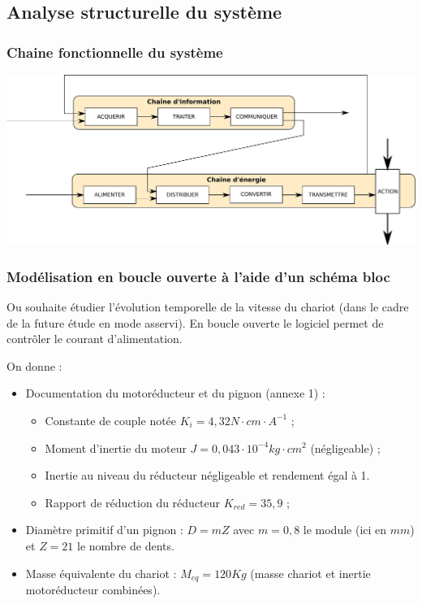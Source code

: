 \subsection{Analyse structurelle du système}
\subsubsection{Chaine fonctionnelle du système}


\begin{center}
\includegraphics[width=1.0\textwidth]{images/chaine_fonctionnelle_vierge.pdf}
\end{center}

\subsubsection{Modélisation en boucle ouverte à l'aide d'un schéma bloc}

Ou souhaite étudier l'évolution temporelle de la vitesse du chariot (dans le cadre de la future étude en mode asservi). En boucle ouverte le logiciel permet de contrôler le courant d'alimentation. 


On donne : 
\begin{itemize}
\item Documentation du motoréducteur et du pignon (annexe 1) :
\begin{itemize}
\item Constante de couple notée $K_i=4,32N\cdot cm\cdot A^{-1}$ ;
\item Moment d'inertie du moteur $J=0,043\cdot 10^{-4}kg\cdot cm^2$ (négligeable) ;
\item Inertie au niveau du réducteur négligeable et rendement égal à 1.
\item Rapport de réduction du réducteur $K_{red}=35,9$ ;
\end{itemize} 
\item Diamètre primitif d'un pignon : $D = m Z$ avec $m=0,8$ le module (ici en $mm$) et $Z=21$ le nombre de dents. 
\item Masse équivalente du chariot : $M_{eq}=120 Kg$ (masse chariot et inertie motoréducteur combinées).
\end{itemize}

